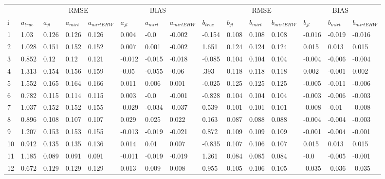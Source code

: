\begin{table}
	\renewcommand{\arraystretch}{1}%
	\footnotesize
	\centering \begin{tabular}{|l|l|lll|lll|l|lll|lll}
		& &  \multicolumn{3}{c}{RMSE}& \multicolumn{3}{c}{BIAS}& & \multicolumn{3}{c}{RMSE}& \multicolumn{3}{c}{BIAS} \\
		i & $a_{true}$ & $a_{jl}$ & $a_{mirt}$ & $a_{mirt EHW}$ & $ a_{jl} $ & $ a_{mirt} $ & $ a_{mirt EHW} $ & $ b_{true} $ & $ b_{jl} $ & $ b_{mirt} $ & $ b_{mirt EHW} $ & $ b_{jl} $ & $b_{mirt}$ & $b_{mirt EHW}$\\
		\hline
		1 & 1.03 & 0.126 & 0.126 & 0.126 & 0.004 & -0.0 & -0.002 & -0.154 & 0.108 & 0.108 & 0.108 & -0.016 & -0.019 & -0.016 \\
		2 & 1.028 & 0.151 & 0.152 & 0.152 & 0.007 & 0.001 & -0.002 & 1.651 & 0.124 & 0.124 & 0.124 & 0.015 & 0.013 & 0.015 \\
		3 & 0.852 & 0.12 & 0.12 & 0.121 & -0.012 & -0.015 & -0.018 & -0.085 & 0.104 & 0.104 & 0.104 & -0.004 & -0.006 & -0.004 \\
		4 & 1.313 & 0.154 & 0.156 & 0.159 & -0.05 & -0.055 & -0.06 & .393 & 0.118 & 0.118 & 0.118 & 0.002 & -0.001 & 0.002 \\
		5 & 1.552 & 0.165 & 0.164 & 0.166 & 0.011 & 0.006 & 0.001 & -0.025 & 0.125 & 0.125 & 0.125 & -0.005 & -0.011 & -0.006 \\
		6 & 0.782 & 0.115 & 0.114 & 0.115 & 0.003 & -0.0 & -0.001 & -0.828 & 0.104 & 0.104 & 0.104 & -0.003 & -0.006 & -0.003 \\
		7 & 1.037 & 0.152 & 0.152 & 0.155 & -0.029 & -0.034 & -0.037 & 0.539 & 0.101 & 0.101 & 0.101 & -0.008 & -0.01 & -0.008 \\
		8 & 0.896 & 0.108 & 0.107 & 0.107 & 0.029 & 0.025 & 0.022 & 0.163 & 0.087 & 0.088 & 0.088 & -0.004 & -0.004 & -0.003 \\
		9 & 1.207 & 0.153 & 0.153 & 0.155 & -0.013 & -0.019 & -0.021 & 0.872 & 0.109 & 0.109 & 0.109 & -0.001 & -0.004 & -0.001 \\
		10 & 0.912 & 0.135 & 0.135 & 0.136 & 0.014 & 0.01 & 0.007 & -0.835 & 0.107 & 0.106 & 0.107 & 0.015 & 0.013 & 0.015 \\
		11 & 1.185 & 0.089 & 0.091 & 0.091 & -0.011 & -0.019 & -0.019 & 1.261 & 0.084 & 0.085 & 0.084 & -0.0 & -0.005 & -0.001 \\
		12 & 0.672 & 0.129 & 0.129 & 0.129 & 0.013 & 0.009 & 0.008 & 0.955 & 0.105 & 0.106 & 0.105 & -0.035 & -0.036 & -0.035 \\

\end{tabular}
\end{table}
